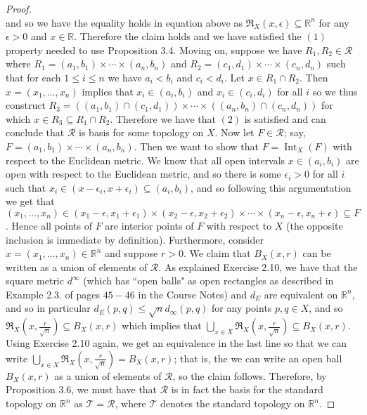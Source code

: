 \documentclass[10pt,reqno]{amsart}
\theoremstyle{definition}
\DeclareMathOperator{\Int}{Int}
\newcommand{\rr}{\mathbb R}
\begin{document}
\begin{tcolorbox}[colback=black!5!white,colframe=black!75!black,title= Chapter 3 $\S3.2$: Exercise 3.2.]
\begin{proof}
\[\] and so we have the equality holds in equation above as $\mathfrak R_X(x, \epsilon) \subseteq \rr^n$ for any $\epsilon>0$ and $x \in \rr$. Therefore the claim holds and we have satisfied the $(1)$ property needed to use Proposition 3.4. Moving on, suppose we have $R_1, R_2 \in \mathcal R$ where $R_1 = (a_1, b_1) \times \cdots \times (a_n, b_n)$ and $R_2 = (c_1, d_1) \times \cdots \times (c_n, d_n)$ such that for each $1 \leq i \leq n$ we have $a_i < b_i$ and $c_i < d_i$. Let $x \in R_1 \cap R_2$. Then $x= (x_1, \ldots, x_n)$ implies that $x_i \in (a_i, b_i)$ and $x_i \in (c_i,d_i)$ for all $i$ so we thus construct  $R_3 = ((a_1, b_1) \cap (c_1, d_1))\times \cdots \times ((a_n, b_n) \cap (c_n, d_n))$ for which $x \in R_3 \subseteq R_1 \cap R_2$. Therefore we have that $(2)$ is satisfied and can conclude that $\mathcal R$ is basis for some topology on $X$. Now let $F \in \mathcal R$; say, $F = (a_1, b_1) \times \cdots \times (a_n, b_n)$. Then we want to show that $F = \Int_X (F)$ with respect to the Euclidean metric. We know that all open intervals $x \in (a_i, b_i)$ are open with respect to the Euclidean metric, and so there is some $\epsilon_i >0$ for all $i$ such that $x_i\in (x-\epsilon_i, x+ \epsilon_i) \subseteq (a_i, b_i)$, and so following this argumentation we get that $(x_1, \ldots, x_n) \in (x_1 - \epsilon, x_1 + \epsilon_1) \times (x_2-\epsilon, x_2 + \epsilon_2) \times \cdots \times (x_n- \epsilon, x_n + \epsilon) \subseteq F$. Hence all points of $F$ are interior points of $F$ with respect to $X$ (the opposite inclusion is immediate by definition). Furthermore, consider $x = (x_1, \ldots, x_n) \in \rr^n$ and suppose $r > 0$. We claim that $B_X(x, r)$ can be written as a union of elements of $\mathcal R$. As explained Exercise 2.10, we have that the square metric $d^\infty$ (which has ``open balls" as open rectangles as described in Example 2.3. of pages $45-46$ in the Course Notes) and $d_E$ are equivalent on $\rr^n$, and so in particular $d_E (p,q) \leq \sqrt{n} d_\infty (p,q)$ for any points $p,q \in X$, and so $\mathfrak R_X(x, \frac{r}{\sqrt{n}}) \subseteq B_X(x,r)$ which implies that $\bigcup_{x \in X} \mathfrak R_X(x,\frac{r}{\sqrt{n}}) \subseteq B_X(x,r)$. Using Exercise 2.10 again, we get an equivalence in the last line so that we can write $\bigcup_{x \in X} \mathfrak R_X(x,\frac{r}{\sqrt{n}}) = B_X(x,r)$; that is, the we can write an open ball $B_X(x,r)$ as a union of elements of $\mathcal R$, so the claim follows. Therefore, by Proposition 3.6, we must have that $\mathcal R$ is in fact the basis for the standard topology on $\rr^n$ as $\mathcal T = \mathcal R$, where $\mathcal T$ denotes the standard topology on $\rr^n$. 
\end{proof}
\end{tcolorbox}
\end{document}
